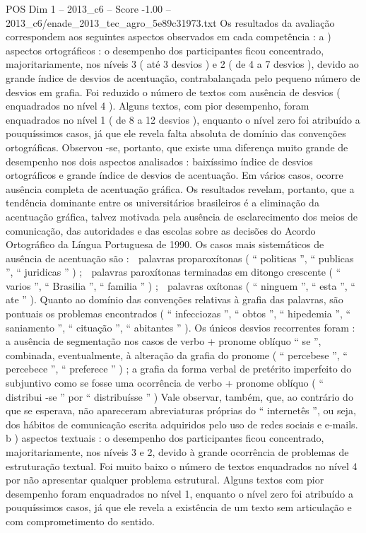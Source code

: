 \begin{textsample}{POS Dim 1 – 2013\_c6 – Score -1.00 – 2013\_c6/enade\_2013\_tec\_agro\_5e89c31973.txt}
Os resultados da avaliação correspondem aos seguintes aspectos observados em cada competência : a ) aspectos ortográficos : o desempenho dos participantes ficou concentrado, majoritariamente, nos níveis 3 ( até 3 desvios ) e 2 ( de 4 a 7 desvios ), devido ao grande índice de desvios de acentuação, contrabalançada pelo pequeno número de desvios em grafia.
Foi reduzido o número de textos com ausência de desvios ( enquadrados no nível 4 ).
Alguns textos, com pior desempenho, foram enquadrados no nível 1 ( de 8 a 12 desvios ), enquanto o nível zero foi atribuído a pouquíssimos casos, já que ele revela falta absoluta de domínio das convenções ortográficas.
Observou -se, portanto, que existe uma diferença muito grande de desempenho nos dois aspectos analisados : baixíssimo índice de desvios ortográficos e grande índice de desvios de acentuação.
Em vários casos, ocorre ausência completa de acentuação gráfica.
Os resultados revelam, portanto, que a tendência dominante entre os universitários brasileiros é a eliminação da acentuação gráfica, talvez motivada pela ausência de esclarecimento dos meios de comunicação, das autoridades e das escolas sobre as decisões do Acordo Ortográfico da Língua Portuguesa de 1990.
Os casos mais sistemáticos de ausência de acentuação são :  palavras proparoxítonas ( “ politicas ”, “ publicas ”, “ juridicas ” ) ;  palavras paroxítonas terminadas em ditongo crescente ( “ varios ”, “ Brasilia ”, “ familia ” ) ;  palavras oxítonas ( “ ninguem ”, “ esta ”, “ ate ” ).
Quanto ao domínio das convenções relativas à grafia das palavras, são pontuais os problemas encontrados ( “ infecciozas ”, “ obtos ”, “ hipedemia ”, “ saniamento ”, “ cituação ”, “ abitantes ” ).
Os únicos desvios recorrentes foram : a ausência de segmentação nos casos de verbo + pronome oblíquo “ se ”, combinada, eventualmente, à alteração da grafia do pronome ( “ percebese ”, “ percebece ”, “ preferece ” ) ; a grafia da forma verbal de pretérito imperfeito do subjuntivo como se fosse uma ocorrência de verbo + pronome oblíquo ( “ distribui -se ” por “ distribuísse ” ) Vale observar, também, que, ao contrário do que se esperava, não apareceram abreviaturas próprias do “ internetês ”, ou seja, dos hábitos de comunicação escrita adquiridos pelo uso de redes sociais e e-mails. b ) aspectos textuais : o desempenho dos participantes ficou concentrado, majoritariamente, nos níveis 3 e 2, devido à grande ocorrência de problemas de estruturação textual.
Foi muito baixo o número de textos enquadrados no nível 4 por não apresentar qualquer problema estrutural.
Alguns textos com pior desempenho foram enquadrados no nível 1, enquanto o nível zero foi atribuído a pouquíssimos casos, já que ele revela a existência de um texto sem articulação e com comprometimento do sentido.

\end{textsample}
